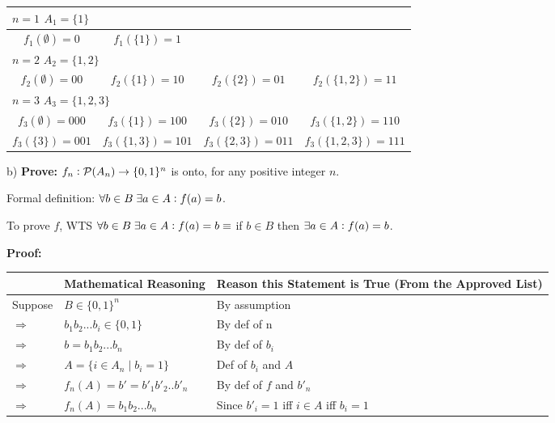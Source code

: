 \documentclass{article}
\begin{document}
\begin{table}[h!]
\hspace{2.5em}\begin{tabular}{|c|c|c|c|}
\hline
\multicolumn{4}{|l|}{$n=1$ \qquad\qquad $A_1 = \{1\}$} \\
\hline
$f_1(\emptyset) = 0$ & $f_1(\{1\}) = 1$ & \multicolumn{2}{l|}{} \\
\hline
\multicolumn{4}{|l|}{$n=2$ \qquad\qquad $A_2 = \{1, 2\}$} \\
\hline
$f_2(\emptyset) = 00$ & $f_2(\{1\}) = 10$ & $f_2(\{2\}) = 01$ & $f_2(\{1, 2\}) = 11$ \\
\hline
\multicolumn{4}{|l|}{$n=3$ \qquad\qquad $A_3 = \{1, 2, 3\}$} \\
\hline
$f_3(\emptyset) = 000$ & $f_3(\{1\}) = 100$ & $f_3(\{2\}) = 010$ & $f_3(\{1, 2\}) = 110$ \\
$f_3(\{3\}) = 001$ & $f_3(\{1, 3\}) = 101$ & $f_3(\{2, 3\}) = 011$ & $f_3(\{1, 2, 3\}) = 111$ \\
\hline
\end{tabular}
\end{table}


b) \textbf{Prove:} $f_n\vcentcolon\mathcal{P}(A_n)\rightarrow\{0,1\}^n$ is onto, for any positive integer $n$.\vspace{5pt}

Formal definition: $\forall b\in B\;\exists a\in A\vcentcolon f(a)=b$.\vspace{2pt}

To prove $f$, WTS $\forall b\in B\;\exists a\in A\vcentcolon f(a)=b\equiv$ if $b\in B$ then $\exists a\in A\vcentcolon f(a)=b$.\vspace{10pt}

\textbf{Proof:} 
\begin{flushleft}
    \begin{tabular}{|p{1.5cm}|p{5.6cm}|p{6cm}|}
        \hline
        & \textbf{Mathematical Reasoning} & \textbf{Reason this Statement is True (From the Approved List)} \\
        \hline
        Suppose & $B\in \{0,1\}^n$ & By assumption \\
        \hline
        $\Rightarrow$ & $b_1b_2...b_i\in\{0,1\}$ & By def of n \\
        \hline
        $\Rightarrow$ & $b=b_1b_2...b_n$ & By def of $b_i$ \\
        \hline
        $\Rightarrow$ & $A=\{i\in A_n\mid b_i=1\}$ & Def of $b_i$ and $A$\\
        \hline
        $\Rightarrow$ & $f_n(A)=b'=b'_1b'_2..b'_n$ & By def of $f$ and $b'_n$ \\
        \hline
        $\Rightarrow$ & $f_n(A)=b_1b_2...b_n$ & Since $b'_i=1$ iff $i\in A$ iff $b_i=1$ \\
        \hline
    \end{tabular}
\end{flushleft}\vspace{10pt}
\end{document}
